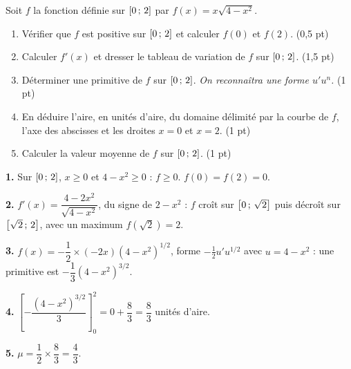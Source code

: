 \begin{commeaubac}
Soit $f$ la fonction définie sur $\left[0\,;\,2\right]$ par
$f(x) = x\sqrt{4-x^{2}}$.

\begin{enumerate}[label=\textbf{\arabic*.}, leftmargin=*, itemsep=0.25em]
  \item Vérifier que $f$ est positive sur $\left[0\,;\,2\right]$ et calculer
        $f(0)$ et $f(2)$. \hfill\textup{(0,5 pt)}
  \item Calculer $f'(x)$ et dresser le tableau de variation de $f$ sur
        $\left[0\,;\,2\right]$. \hfill\textup{(1,5 pt)}
  \item Déterminer une primitive de $f$ sur $\left[0\,;\,2\right]$.
        \emph{On reconnaîtra une forme $u'u^{n}$.} \hfill\textup{(1 pt)}
  \item En déduire l'aire, en unités d'aire, du domaine délimité par la courbe
        de $f$, l'axe des abscisses et les droites $x=0$ et $x=2$.
        \hfill\textup{(1 pt)}
  \item Calculer la valeur moyenne de $f$ sur $\left[0\,;\,2\right]$.
        \hfill\textup{(1 pt)}
\end{enumerate}
\end{commeaubac}

\begin{corrige}
\textbf{1.} Sur $\left[0\,;\,2\right]$, $x \geq 0$ et $4-x^{2} \geq 0$ : $f \geq 0$.
$f(0) = f(2) = 0$.

\textbf{2.} $f'(x) = \dfrac{4-2x^{2}}{\sqrt{4-x^{2}}}$, du signe de $2-x^{2}$ :
$f$ croît sur $\left[0\,;\,\sqrt2\right]$ puis décroît sur $\left[\sqrt2\,;\,2\right]$,
avec un maximum $f(\sqrt2) = 2$.

\textbf{3.} $f(x) = -\dfrac{1}{2}\times(-2x)\left(4-x^{2}\right)^{1/2}$, forme
$-\frac12 u'u^{1/2}$ avec $u = 4-x^{2}$ : une primitive est
$-\dfrac{1}{3}\left(4-x^{2}\right)^{3/2}$.

\textbf{4.} $\left[-\dfrac{(4-x^{2})^{3/2}}{3}\right]_{0}^{2} = 0 + \dfrac{8}{3}
= \dfrac{8}{3}$ unités d'aire.

\textbf{5.} $\mu = \dfrac{1}{2}\times\dfrac{8}{3} = \dfrac{4}{3}$.
\end{corrige}
